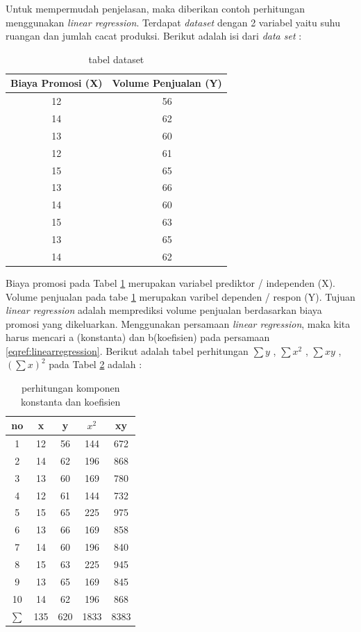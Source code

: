 \documentclass[a4paper,twoside]{article}
\begin{document}
\begin{enumerate}
Untuk mempermudah penjelasan, maka diberikan contoh perhitungan menggunakan \textit{linear regression}. Terdapat \textit{dataset} dengan 2 variabel yaitu suhu ruangan dan jumlah cacat produksi. Berikut adalah isi dari \textit{data set} : 

\begin{table}[ht]
\centering
\begin{tabular}{|c|c|}
\hline 
Biaya Promosi (X) & Volume Penjualan (Y) \\ 
\hline 
12 & 56 \\ 
\hline 
14 & 62 \\ 
\hline 
13 & 60 \\ 
\hline 
12 & 61 \\ 
\hline 
15 & 65 \\ 
\hline 
13 & 66 \\ 
\hline 
14 & 60 \\ 
\hline 
15 & 63 \\ 
\hline 
13 & 65 \\ 
\hline 
14 & 62 \\ 
\hline 
\end{tabular} 
\caption{tabel dataset }
\label{tab:dataset}
\end{table}
\pagebreak
Biaya promosi pada Tabel \ref{tab:dataset} merupakan variabel prediktor / independen (X). Volume penjualan pada tabe \ref{tab:dataset} merupakan varibel dependen / respon (Y). Tujuan \textit{linear regression} adalah memprediksi volume penjualan berdasarkan biaya promosi yang dikeluarkan. Menggunakan persamaan \textit{linear regression}, maka kita harus mencari a (konstanta) dan b(koefisien) pada persamaan \ref{eqref:linearregression}. Berikut adalah tabel perhitungan $\sum y$  , $\sum x^2$ , $\sum xy$ , $(\sum x)^2$ pada Tabel \ref{tab:konstantakoefisienlinear} adalah :
\begin{table}[ht]
\centering
\begin{tabular}{|c|c|c|c|c|}
\hline 
no & x & y & $x^2$ & xy \\ 
\hline 
1 & 12 & 56 & 144 & 672 \\ 
\hline 
2 & 14 & 62 & 196 & 868 \\ 
\hline 
3 & 13 & 60 & 169 & 780 \\ 
\hline 
4 & 12 & 61 & 144 & 732 \\ 
\hline 
5 & 15 & 65 & 225 & 975 \\ 
\hline 
6 & 13 & 66 & 169 & 858 \\ 
\hline 
7 & 14 & 60 & 196 & 840 \\ 
\hline 
8 & 15 & 63 & 225 & 945 \\ 
\hline 
9 & 13 & 65 & 169 & 845 \\ 
\hline 
10 & 14 & 62 & 196 & 868 \\ 
\hline 
$\sum $ & 135 & 620 & 1833 & 8383 \\ 
\hline 
\end{tabular} 
\caption{ perhitungan komponen konstanta dan koefisien}
\label{tab:konstantakoefisienlinear}
\end{table} 


\end{enumerate}
\end{document}
